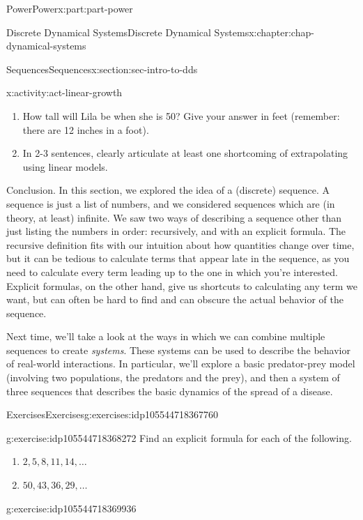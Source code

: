 \documentclass[oneside,10pt,]{book}
\numberwithin{equation}{section}
\begin{document}
\begin{partptx}{Power}{}{Power}{}{}{x:part:part-power}
\begin{chapterptx}{Discrete Dynamical Systems}{}{Discrete Dynamical Systems}{}{}{x:chapter:chap-dynamical-systems}
\begin{sectionptx}{Sequences}{}{Sequences}{}{}{x:section:sec-intro-to-dds}
\begin{activity}{}{x:activity:act-linear-growth}
\begin{enumerate}
\item{}How tall will Lila be when she is 50? Give your answer in feet (remember: there are 12 inches in a foot).%
\item{}In 2-3 sentences, clearly articulate at least one shortcoming of extrapolating using linear models.%
\end{enumerate}
\end{activity}%
\begin{conclusion}{Conclusion.}%
In this section, we explored the idea of a (discrete) sequence. A sequence is just a list of numbers, and we considered sequences which are (in theory, at least) infinite. We saw two ways of describing a sequence other than just listing the numbers in order: recursively, and with an explicit formula. The recursive definition fits with our intuition about how quantities change over time, but it can be tedious to calculate terms that appear late in the sequence, as you need to calculate every term leading up to the one in which you're interested. Explicit formulas, on the other hand, give us shortcuts to calculating any term we want, but can often be hard to find and can obscure the actual behavior of the sequence.%
\par
Next time, we'll take a look at the ways in which we can combine multiple sequences to create \emph{systems}. These systems can be used to describe the behavior of real-world interactions. In particular, we'll explore a basic predator-prey model (involving two populations, the predators and the prey), and then a system of three sequences that describes the basic dynamics of the spread of a disease.%
\end{conclusion}%
%
%
\typeout{************************************************}
\typeout{************************************************}
%
\begin{exercises-subsection-numberless}{Exercises}{}{Exercises}{}{}{g:exercises:idp105544718367760}
\begin{divisionexercise}{1}{}{}{g:exercise:idp105544718368272}%
Find an explicit formula for each of the following.%
%
\begin{enumerate}[label=(\alph*)]
\item{}\(\displaystyle 2, 5, 8, 11, 14, \ldots\)%
\item{}\(\displaystyle 50, 43, 36, 29, \ldots\)%
\end{enumerate}
\end{divisionexercise}%
\begin{divisionexercise}{2}{}{}{g:exercise:idp105544718369936}%

\end{divisionexercise}
\end{exercises-subsection-numberless}
\end{sectionptx}
\end{chapterptx}
\end{partptx}
\end{document}
